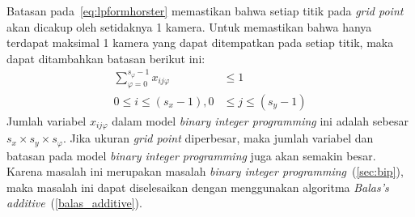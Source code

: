Batasan pada~\ref{eq:lpformhorster} memastikan bahwa setiap titik pada \textit{grid point} akan dicakup oleh setidaknya 1 kamera. Untuk memastikan bahwa hanya terdapat maksimal 1 kamera yang dapat ditempatkan pada setiap titik, maka dapat ditambahkan batasan berikut ini:
\begin{equation}
	\begin{split}
		\sum_{\varphi=0}^{s_\varphi-1}x_{ij\varphi}&\leq 1\\
		0\leq i\leq(s_x-1), 0&\leq j\leq(s_y-1)
	\end{split}
\end{equation}
Jumlah variabel \(x_{ij\varphi}\) dalam model \textit{binary integer programming} ini adalah sebesar \(s_x\times s_y\times s_\varphi\). Jika ukuran \textit{grid point} diperbesar, maka jumlah variabel dan batasan pada model \textit{binary integer programming} juga akan semakin besar. Karena masalah ini merupakan masalah \textit{binary integer programming}~(\ref{sec:bip}), maka masalah ini dapat diselesaikan dengan menggunakan algoritma \textit{Balas's additive}~(\ref{balas_additive}).